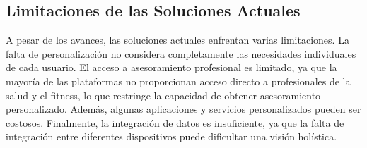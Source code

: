 \subsection{Limitaciones de las Soluciones Actuales}

A pesar de los avances, las soluciones actuales enfrentan varias limitaciones. La falta de personalización no considera completamente las necesidades individuales de cada usuario. El acceso a asesoramiento profesional es limitado, ya que la mayoría de las plataformas no proporcionan acceso directo a profesionales de la salud y el fitness, lo que restringe la capacidad de obtener asesoramiento personalizado. Además, algunas aplicaciones y servicios personalizados pueden ser costosos. Finalmente, la integración de datos es insuficiente, ya que la falta de integración entre diferentes dispositivos puede dificultar una visión holística.